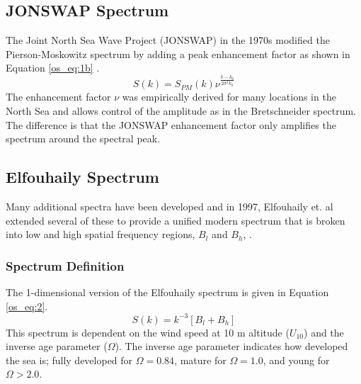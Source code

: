 \subsection{JONSWAP Spectrum}
The Joint North Sea Wave Project (JONSWAP) in the 1970s modified the Pierson-Moskowitz spectrum by adding a peak enhancement factor as shown in Equation \ref{os_eq:1b} \cite{michel_sea_spectra}.
\begin{equation}
  \label{os_eq:1b}
  S(k) = S_{PM}(k)\nu^{\frac{k-k_0}{2\sigma^2k_0}} 
  \end{equation}
The enhancement factor $\nu$ was empirically derived for many locations in the North Sea and allows control of the amplitude as in the Bretschneider spectrum. The difference is that the JONSWAP enhancement factor only amplifies the spectrum around the spectral peak.

\subsection{Elfouhaily Spectrum}
Many additional spectra have been developed and in 1997, Elfouhaily et. al extended several of these to provide a unified modern spectrum that is broken into low and high spatial frequency regions, $B_l$ and $B_h$, \cite{elfouhaily}. 

\subsubsection{Spectrum Definition}
The 1-dimensional version of the Elfouhaily spectrum is given in Equation \ref{os_eq:2}.
\begin{equation}
  \label{os_eq:2}
  S(k) = k^{-3}\left[B_l + B_h \right]
\end{equation}
\renewcommand{\baselinestretch}{2} \small\normalsize
This spectrum is dependent on the wind speed at 10 m altitude ($U_{10}$) and the inverse age parameter ($\Omega$). The inverse age parameter indicates how developed the sea is; fully developed for $\Omega = 0.84$, mature for $\Omega = 1.0$, and young for $\Omega > 2.0$. 

